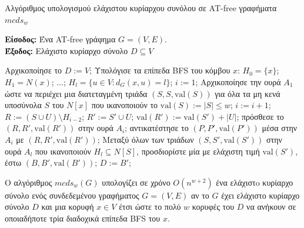 \begin{algorithm}[H]
	\caption{Αλγόριθμος υπολογισμού ελάχιστου κυρίαρχου συνόλου σε AT-free γραφήματα $mcds_w$}
	\label{alg:domi-set}
	\hspace*{\algorithmicindent} \textbf{Είσοδος:} Ένα AT-free γράφημα $G = (V,E)$.\\
	\hspace*{\algorithmicindent} \textbf{Έξοδος:} Ελάχιστο κυρίαρχο σύνολο $D \subseteq V$
	
	\begin{algorithmic}[1]	
		\STATE Αρχικοποίησε το $D := V$;
		\STATE Υπολόγισε τα επίπεδα BFS του κόμβου $x$:
		\STATE $H_0 = \{x\}$; $H_1 = N(x)$; $\ldots$; $H_l = \{u \in V : d_G(x, u) = l\}$;
		\STATE $i := 1$;
		\STATE Αρχικοποίησε την ουρά $A_1$ ώστε να περιέχει μια διατεταγμένη τριάδα $(S, S, \text{val}(S))$ για όλα τα μη κενά υποσύνολα $S$ του $N[x]$ που ικανοποιούν το $\text{val}(S) := |S| \leq w$;
		\STATE $i := i + 1$;
		\STATE $R := (S \cup U) \setminus H_{i-2}$;
		\STATE $R' := S' \cup U$;
		\STATE $\text{val}(R') := \text{val}(S') + |U|$;
		\STATE πρόσθεσε το $(R, R', \text{val}(R'))$ στην ουρά $A_i$;
		\ENDIF
		\STATE αντικατέστησε το $(P, P', \text{val}(P'))$ μέσα στην $A_i$ με $(R, R', \text{val}(R'))$;
		\ENDIF
		\ENDIF
		\ENDFOR
		\ENDFOR
		\ENDWHILE
		\STATE Μεταξύ όλων των τριάδων $(S, S', \text{val}(S'))$ στην ουρά $A_l$ που ικανοποιούν $H_l \subseteq N[S]$, προσδιορίστε μία με ελάχιστη τιμή $\text{val}(S')$, έστω $(B, B', \text{val}(B'))$;
		\STATE $D := B'$;
		\ENDIF
		\ENDFOR
	\end{algorithmic}
	
\end{algorithm}

\begin{theorem}
	Ο αλγόριθμος $mcds_w(G)$ υπολογίζει σε χρόνο $O(n^{w+2})$ ένα ελάχιστo κυρίαρχο σύνολο ενός συνδεδεμένου γραφήματος $G= (V,E)$ αν το $G$ έχει ελάχιστο 
	κυρίαρχο σύνολο $D$ και μια κορυφή $x\in V$ έτσι ώστε το πολύ $w$ κορυφές του $D$ να ανήκουν
	σε οποιαδήποτε τρία διαδοχικά επίπεδα BFS του $x$.
\end{theorem}

